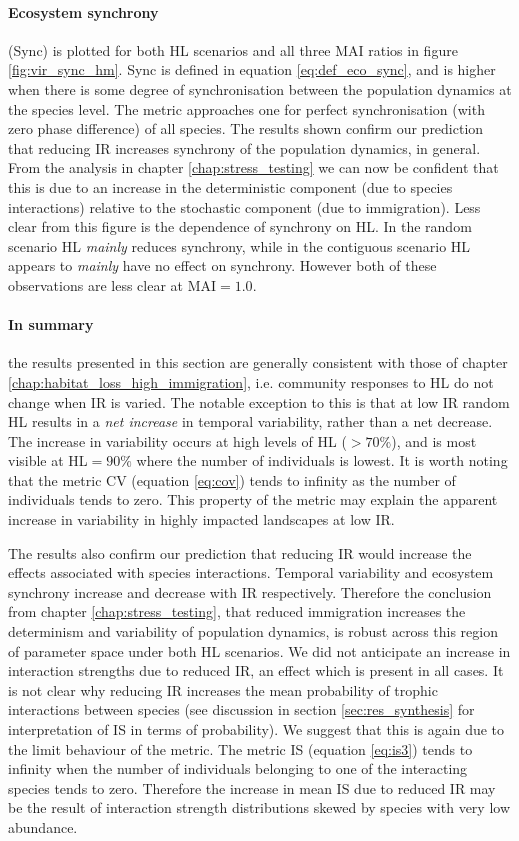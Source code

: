 \paragraph*{Ecosystem synchrony} (Sync) is plotted for both HL scenarios and all three MAI ratios in figure \ref{fig:vir_sync_hm}. Sync is defined in equation \eqref{eq:def_eco_sync}, and is higher when there is some degree of synchronisation between the population dynamics at the species level. The metric approaches one for perfect synchronisation (with zero phase difference)  of all species. The results shown confirm our prediction that reducing IR increases synchrony of the population dynamics, in general. From the analysis in chapter \ref{chap:stress_testing} we can now be confident that this is due to an increase in the deterministic component (due to species interactions) relative to the stochastic component (due to immigration). Less clear from this figure is the dependence of synchrony on HL. In the random scenario HL \emph{mainly} reduces synchrony, while in the contiguous scenario HL appears to \emph{mainly} have no effect on synchrony. However both of these observations are less clear at MAI$=1.0$.

\paragraph*{In summary} the results presented in this section are generally consistent with those of chapter \ref{chap:habitat_loss_high_immigration}, i.e. community responses to HL do not change when IR is varied. The notable exception to this is that at low IR random HL results in a \emph{net increase} in temporal variability, rather than a net decrease. The increase in variability occurs at high levels of HL ($>70\%$), and is most visible at HL$=90\%$ where the number of individuals is lowest. It is worth noting that the metric CV (equation \eqref{eq:cov}) tends to infinity as the number of individuals tends to zero. This property of the metric may explain the apparent increase in variability in highly impacted landscapes at low IR.

The results also confirm our prediction that reducing IR would increase the effects associated with species interactions. Temporal variability and ecosystem synchrony increase and decrease with IR respectively. Therefore the conclusion from chapter \ref{chap:stress_testing}, that reduced immigration increases the determinism and variability of population dynamics, is robust across this region of parameter space under both HL scenarios. We did not anticipate an increase in interaction strengths due to reduced IR, an effect which is present in all cases. It is not clear why reducing IR increases the mean probability of trophic interactions between species (see discussion in section \ref{sec:res_synthesis} for interpretation of IS in terms of probability). We suggest that this is again due to the limit behaviour of the metric. The metric IS (equation \eqref{eq:is3}) tends to infinity when the number of individuals belonging to one of the interacting species tends to zero. Therefore the increase in mean IS due to reduced IR may be the result of interaction strength distributions skewed by species with very low abundance.

